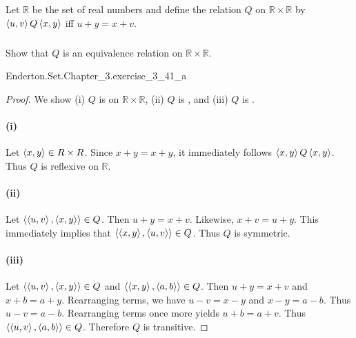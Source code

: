 \documentclass{report}
\begin{document}
\subsection{}%

  Let $\mathbb{R}$ be the set of real numbers and define the relation $Q$ on
    $\mathbb{R} \times \mathbb{R}$ by $\left< u, v \right>Q\left< x, y \right>$ iff
    $u + y = x + v$.

\subsubsection{}%

  Show that $Q$ is an equivalence relation on $\mathbb{R} \times \mathbb{R}$.

    {Enderton.Set.Chapter\_3.exercise\_3\_41\_a}

  \begin{proof}
    We show (i) $Q$ is  on
      $\mathbb{R} \times \mathbb{R}$, (ii) $Q$ is , and
      (iii) $Q$ is .

    \paragraph{(i)}%

      Let $\left< x, y \right> \in R \times R$.
      Since $x + y = x + y$, it immediately follows $\left< x, y \right>Q\left< x, y \right>$.
      Thus $Q$ is reflexive on $\mathbb{R}$.

    \paragraph{(ii)}%

      Let $\left< \left< u, v \right>, \left< x, y \right> \right> \in Q$.
      Then $u + y = x + v$.
      Likewise, $x + v = u + y$.
      This immediately implies that $\left< \left< x, y \right>, \left< u, v \right> \right> \in Q$.
      Thus $Q$ is symmetric.

    \paragraph{(iii)}%

      Let $\left< \left< u, v \right>, \left< x, y \right> \right> \in Q$ and
        $\left< \left< x, y \right>, \left< a, b \right> \right> \in Q$.
      Then $u + y = x + v$ and $x + b = a + y$.
      Rearranging terms, we have $u - v = x - y$ and $x - y = a - b$.
      Thus $u - v = a - b$.
      Rearranging terms once more yields $u + b = a + v$.
      Thus $\left< \left< u, v \right>, \left< a, b \right> \right> \in Q$.
      Therefore $Q$ is transitive.

  \end{proof}
\end{document}
